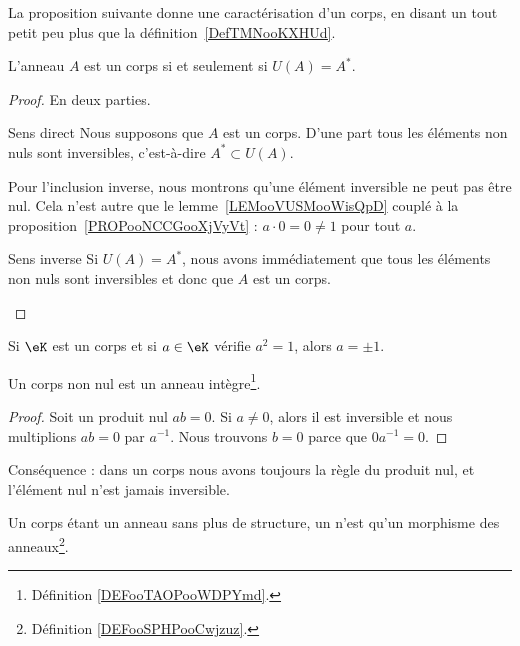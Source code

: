 La proposition suivante donne une caractérisation d'un corps, en disant un tout petit peu plus que la définition~\ref{DefTMNooKXHUd}.
\begin{proposition}
    L'anneau $A$ est un corps si et seulement si \( U(A) = A^* \).
\end{proposition}

\begin{proof}
    En deux parties.
    \begin{subproof}
        \item[Sens direct]
            Nous supposons que \( A\) est un corps. D'une part tous les éléments non nuls sont inversibles, c'est-à-dire \( A^*\subset U(A)\).
            
            Pour l'inclusion inverse, nous montrons qu'une élément inversible ne peut pas être nul. Cela n'est autre que le lemme~\ref{LEMooVUSMooWisQpD} couplé à la proposition~\ref{PROPooNCCGooXjVyVt} : \( a\cdot 0=0\neq 1\) pour tout \( a\).
        \item[Sens inverse]
            Si \( U(A)=A^*\), nous avons immédiatement que tous les éléments non nuls sont inversibles et donc que \( A\) est un corps.
    \end{subproof}
\end{proof}

\begin{lemma}       \label{LEMooJNIBooAURhrt}
    Si \( \eK\) est un corps et si \( a\in \eK\) vérifie \( a^2=1\), alors \( a=\pm 1\).
\end{lemma}

\begin{lemma}       \label{LemAnnCorpsnonInterdivzer}
    Un corps non nul est un anneau intègre\footnote{Définition \ref{DEFooTAOPooWDPYmd}.}.
\end{lemma}

\begin{proof}
    Soit un produit nul \( ab=0\). Si \( a\neq 0\), alors il est inversible et nous multiplions \( ab=0\) par \( a^{-1}\). Nous trouvons \( b=0\) parce que \( 0a^{-1}=0\).
\end{proof}
Conséquence : dans un corps nous avons toujours la règle du produit nul, et l'élément nul n'est jamais inversible.

\begin{definition}
    Un corps étant un anneau sans plus de structure, un  n'est qu'un morphisme des anneaux\footnote{Définition \ref{DEFooSPHPooCwjzuz}.}.
\end{definition}

